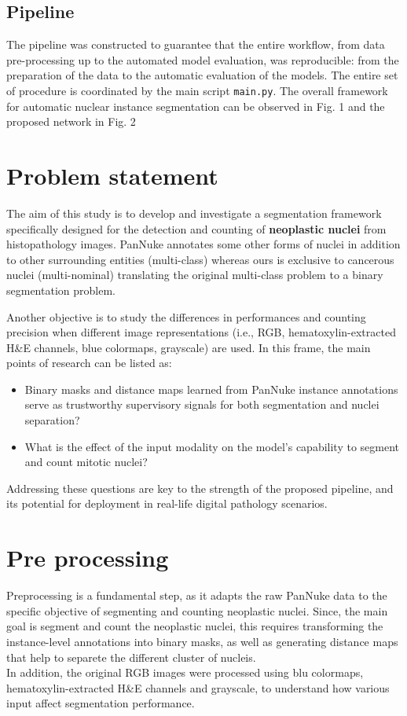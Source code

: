 \documentclass[target=bach,aauheader=,style=]{thud}
\begin{document}
\subsection{Pipeline} The pipeline was constructed to guarantee that the entire workflow, from data pre-processing up to the automated model evaluation, was reproducible: from the preparation of the data to the automatic evaluation of the models. The entire set of procedure is coordinated by the main script \texttt{main.py}. The overall framework for automatic nuclear instance segmentation can be observed in Fig. 1 and the proposed network in Fig. 2

\section{Problem statement} The aim of this study is to develop and investigate a segmentation framework specifically designed for the detection and counting of \textbf{neoplastic nuclei} from histopathology images. PanNuke annotates some other forms of nuclei in addition to other surrounding entities (multi-class) whereas ours is exclusive to cancerous nuclei (multi-nominal) translating the original multi-class problem to a binary segmentation problem.

Another objective is to study the differences in performances and counting precision when different image representations (i.e., RGB, hematoxylin-extracted H\&E channels, blue colormaps, grayscale) are used. In this frame, the main points of research can be listed as: \begin{itemize} \item Binary masks and distance maps learned from PanNuke instance annotations serve as trustworthy supervisory signals for both segmentation and nuclei separation? \item What is the effect of the input modality on the model's capability to segment and count mitotic nuclei? \end{itemize}

Addressing these questions are key to the strength of the proposed pipeline, and its potential for deployment in real-life digital pathology scenarios.

\section{Pre processing}
Preprocessing is a fundamental step, as it adapts the raw PanNuke data to the specific objective of segmenting and counting neoplastic nuclei. Since, the main goal is segment and count the neoplastic nuclei, this requires transforming the instance-level annotations into binary masks, as well as generating distance maps that help to separete the different cluster of nucleis.\\
In addition, the original RGB images were processed using blu colormaps, hematoxylin-extracted H\&E channels and grayscale, to understand how various input affect segmentation performance.
\end{document}
